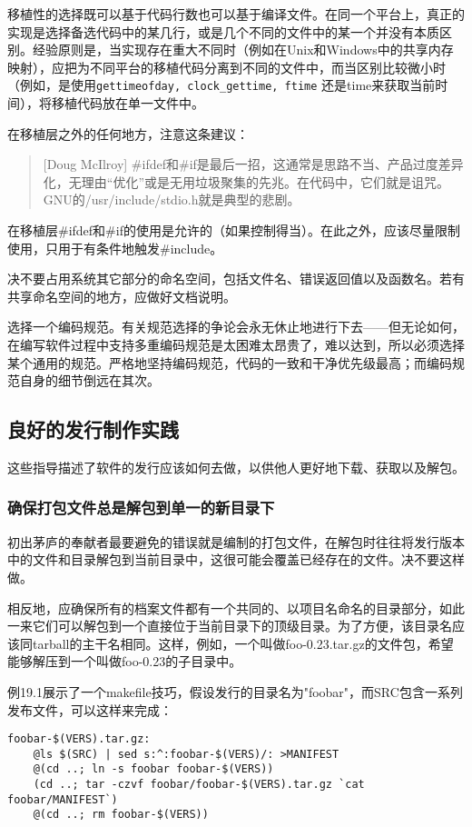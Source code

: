 \documentclass[12pt,oneside]{ctexbook}
\begin{document}
\begin{common-format}
移植性的选择既可以基于代码行数也可以基于编译文件。在同一个平台上，真正的实现是选择备选代码中的某几行，或是几个不同的文件中的某一个并没有本质区别。经验原则是，当实现存在重大不同时（例如在Unix和Windows中的共享内存映射），应把为不同平台的移植代码分离到不同的文件中，而当区别比较微小时（例如，是使用\verb+gettimeofday, clock_gettime, ftime+ 还是time来获取当前时间），将移植代码放在单一文件中。

在移植层之外的任何地方，注意这条建议：
\begin{quote}[Doug McIlroy]
\#{}ifdef和\#{}if是最后一招，这通常是思路不当、产品过度差异化，无理由“优化”或是无用垃圾聚集的先兆。在代码中，它们就是诅咒。GNU的/usr/include/stdio.h就是典型的悲剧。
\end{quote}

在移植层\#{}ifdef和\#{}if的使用是允许的（如果控制得当）。在此之外，应该尽量限制使用，只用于有条件地触发\#{}include。

决不要占用系统其它部分的命名空间，包括文件名、错误返回值以及函数名。若有共享命名空间的地方，应做好文档说明。

选择一个编码规范。有关规范选择的争论会永无休止地进行下去——但无论如何，在编写软件过程中支持多重编码规范是太困难太昂贵了，难以达到，所以必须选择某个通用的规范。严格地坚持编码规范，代码的一致和干净优先级最高；而编码规范自身的细节倒远在其次。

\subsection{良好的发行制作实践}
这些指导描述了软件的发行应该如何去做，以供他人更好地下载、获取以及解包。

\subsubsection{确保打包文件总是解包到单一的新目录下}
初出茅庐的奉献者最要避免的错误就是编制的打包文件，在解包时往往将发行版本中的文件和目录解包到当前目录中，这很可能会覆盖已经存在的文件。决不要这样做。

相反地，应确保所有的档案文件都有一个共同的、以项目名命名的目录部分，如此一来它们可以解包到一个直接位于当前目录下的顶级目录。为了方便，该目录名应该同tarball的主干名相同。这样，例如，一个叫做foo-0.23.tar.gz的文件包，希望能够解压到一个叫做foo-0.23的子目录中。

例19.1展示了一个makefile技巧，假设发行的目录名为"foobar"，而SRC包含一系列发布文件，可以这样来完成：

\begin{Verbatim}[label = 例19.1  tar文件包制作过程]
foobar-$(VERS).tar.gz:
	@ls $(SRC) | sed s:^:foobar-$(VERS)/: >MANIFEST
	@(cd ..; ln -s foobar foobar-$(VERS))
	(cd ..; tar -czvf foobar/foobar-$(VERS).tar.gz `cat foobar/MANIFEST`)
	@(cd ..; rm foobar-$(VERS))
\end{Verbatim}


\end{common-format}
\end{document}
